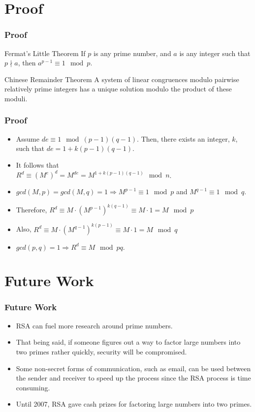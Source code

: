 \documentclass{beamer}
\begin{document}
\section{Proof}
\begin{frame}
\frametitle{Proof}
\begin{block}{Fermat's Little Theorem}
If $p$ is any prime number, and $a$ is any integer such that $p \nmid a$, then $a^{p-1}\equiv 1\mod p$. \\
\end{block}
\begin{block}{Chinese Remainder Theorem}
A system of linear congruences modulo pairwise relatively prime integers has a unique solution modulo the product of these moduli.\\
\end{block}
\end{frame}
\begin{frame}
\frametitle{Proof}
\begin{itemize}
\item Assume $de \equiv 1\mod (p-1)(q-1)$. Then, there exists an integer, $k$, such that $de=1+k(p-1)(q-1)$. 
\item It follows that\\
 $R^d\equiv (M^e)^d=M^{de}=M^{1+k(p-1)(q-1)}\mod n$.
\item $gcd(M, p)=gcd(M,q)=1 \Rightarrow M^{p-1}\equiv 1 \mod p$ and $M^{q-1} \equiv 1 \mod q$. 
\item Therefore, $R^d \equiv M \cdot (M^{p-1})^{k(q-1)}\equiv M\cdot 1 = M \mod p$
\item Also, $R^d \equiv M \cdot (M^{q-1})^{k(p-1)}\equiv M\cdot 1 = M \mod q$
\item $gcd(p, q)=1 \Rightarrow R^d\equiv M\mod pq$.
\end{itemize}
\end{frame}
\section{Future Work}
\begin{frame}
\frametitle{Future Work}
\begin{itemize}
\item RSA can fuel more research around prime numbers.
\item That being said, if someone figures out a way to factor large numbers into two primes rather quickly, security will be compromised.
\item Some non-secret forms of communication, such as email, can be used between the sender and receiver to speed up the process since the RSA process is time consuming.
\item Until 2007, RSA gave cash prizes for factoring large numbers into two primes. 
\end{itemize}
\end{frame}
\end{document}
